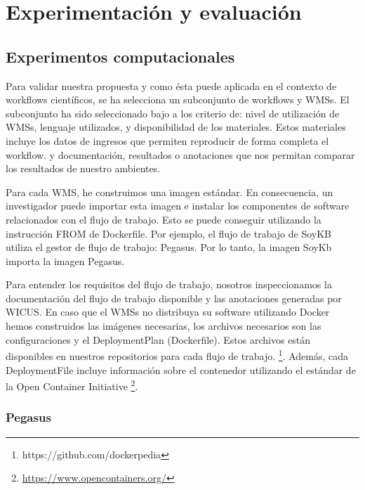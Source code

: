 \chapter{Experimentación y evaluación}


\section{Experimentos computacionales}\label{s5.1}

Para validar nuestra propuesta y como ésta puede aplicada en el contexto de workflows científicos, se ha selecciona un subconjunto de workflows y WMSs. 
El subconjunto ha sido seleccionado bajo a los criterio de: nivel de utilización de WMSs, lenguaje utilizados, y disponibilidad de los materiales. 
Estos materiales incluye los datos de ingresos que permiten reproducir de forma completa el workflow. y documentación, resultados o anotaciones que nos permitan comparar los resultados de nuestro ambientes.


Para cada WMS, he construimos una imagen estándar. En consecuencia, un investigador puede importar esta imagen e instalar los componentes de software relacionados con el flujo de trabajo.
Esto se puede conseguir utilizando la instrucción FROM de Dockerfile. Por ejemplo, el flujo de trabajo de SoyKB utiliza el gestor de flujo de trabajo: Pegasus. Por lo tanto, la imagen SoyKb importa la imagen Pegasus.

Para entender los requisitos del flujo de trabajo, nosotros inspeccionamos la documentación del flujo de trabajo disponible y las anotaciones generadas por WICUS.
En caso que el WMSs no distribuya su software utilizando Docker hemos construidos las imágenes necesarias, los archivos necesarios son las configuraciones y el DeploymentPlan (Dockerfile). Estos archivos están disponibles en nuestros repositorios para cada flujo de trabajo. \footnote{https://github.com/dockerpedia}.
Además, cada DeploymentFile incluye información sobre el contenedor utilizando el estándar de la Open Container Initiative \footnote{\url{https://www.opencontainers.org/}}. 


\subsection{Pegasus}


